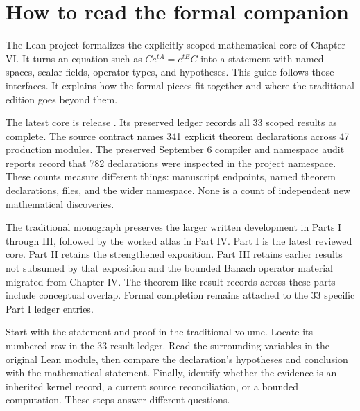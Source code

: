 \section{How to read the formal companion}
\label{sec:reading}
The Lean project formalizes the explicitly scoped mathematical core of Chapter VI. It turns an equation such as $Ce^{tA}=e^{tB}C$ into a statement with named spaces, scalar fields, operator types, and hypotheses. This guide follows those interfaces. It explains how the formal pieces fit together and where the traditional edition goes beyond them.

The latest core is release . Its preserved ledger records all 33 scoped results as complete. The source contract names 341 explicit theorem declarations across 47 production modules. The preserved September 6 compiler and namespace audit reports record that 782 declarations were inspected in the project namespace. These counts measure different things: manuscript endpoints, named theorem declarations, files, and the wider namespace. None is a count of independent new mathematical discoveries.

The traditional monograph preserves the larger written development in Parts I through III, followed by the worked atlas in Part IV. Part I is the latest reviewed core. Part II retains the strengthened exposition. Part III retains earlier results not subsumed by that exposition and the bounded Banach operator material migrated from Chapter IV. The theorem-like result records across these parts include conceptual overlap. Formal completion remains attached to the 33 specific Part I ledger entries.

\begin{readerroadmap}[title={Read one endpoint through its whole interface}]
Start with the statement and proof in the traditional volume. Locate its numbered row in the 33-result ledger. Read the surrounding variables in the original Lean module, then compare the declaration's hypotheses and conclusion with the mathematical statement. Finally, identify whether the evidence is an inherited kernel record, a current source reconciliation, or a bounded computation. These steps answer different questions.
\end{readerroadmap}

